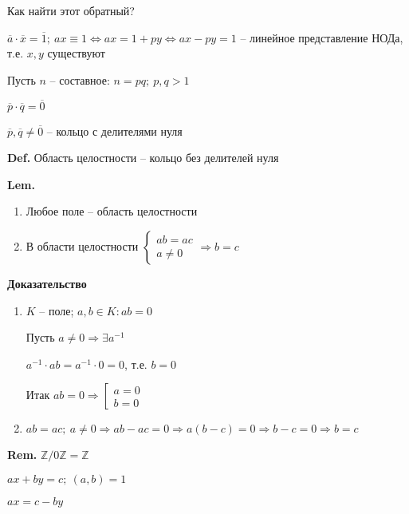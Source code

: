 \documentclass[14pt, letter paper]{article}
\begin{document}
Как найти этот обратный?

$\overline{a} \cdot \overline{x} = \overline{1};\ ax \equiv 1 \Leftrightarrow ax = 1 + py \Leftrightarrow ax - py = 1$ -- линейное представление НОДа, т.е. $x, y$ существуют

Пусть $n$ -- составное: $n = pq;\ p,q > 1$

$\overline{p} \cdot \overline{q} = \overline{0}$

$\overline{p}, \overline{q} \neq \overline{0}$ -- кольцо с делителями нуля

\textbf{Def.} Область целостности -- кольцо без делителей нуля

\textbf{Lem.}

\begin{enumerate}
    \item Любое поле -- область целостности

    \item В области целостности $\begin{cases}
        ab = ac \\
        a \neq 0
    \end{cases} \Rightarrow b = c$
\end{enumerate}

\begin{center}
    \textbf{Доказательство}
\end{center}

\begin{enumerate}
    \item $K$ -- поле; $a, b \in K : ab = 0$

    Пусть $a \neq 0 \Rightarrow \exists a^{-1}$

    $a^{-1} \cdot ab = a^{-1} \cdot 0 = 0$, т.е. $b = 0$

    Итак $ab = 0 \Rightarrow \left[ \begin{gathered}
        a = 0 \\
        b = 0
    \end{gathered}\right.$

    \item $ab = ac;\ a \neq 0 \Rightarrow ab-ac = 0 \Rightarrow a(b-c) = 0 \Rightarrow b - c = 0 \Rightarrow b = c$

    
\end{enumerate}

\textbf{Rem.} $\mathds{Z}/0\mathds{Z} = \mathds{Z}$

    $ax + by = c;\ (a,b) = 1$

    $ax = c - by$
\end{document}
